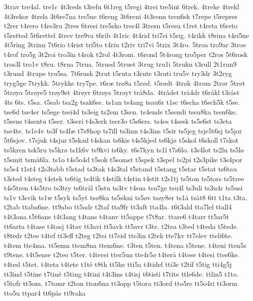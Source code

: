 3trav
tre4al.
tre1c
4t3reds
t3refu
6t1reg
t5regi
4trei
tre5int
6trek.
4treke
4trekl
4t3rekor
4trela
3t6re7na
tre5ne
t6reng
3t6reni
4t3renn
tren6sk
t7repe
t5repres
t2rer
t4rero
t4re3ru
2tres
6tresi
tre5sko
tres4l
3tresn
t5resu
t1ret
t4reta
t6reto
t5retted
5t6rettel
4trev
tre9va
t6rib
4t1ric
4t4rid
tri7ei
t5rig.
t4rikk
t8rina
t4ri5ne
4t5ring
3trinn
7t6rio
t4rist
tri5to
t4riu
t2riv
tri7vi
5trix
3t4ro.
5troa
tro9ar
3troe
t4rof
tro5g
3t2roi
tro3in
t4rok
t2rol
4t3rom.
t6rond
5t4rong
tro5per
t2ros
5t6rosk
tros3l
tro1v
t8ru.
t8rua
7trua.
5trued
5truet
3trug
tru1i
5trukn
t3rull
2t1run9
t3rund
4trupe
tru5sa.
7t6rusk
2trut
t5ruta
t3rute
t3ruti
tru5v
try3dr
3t2ryg
tryg5ge
7trykk.
5trykke
try7pe.
t6r^^e6
tr^^f88a
t5r^^f8d.
t5r^^f8dt
4tr^^f8k
4tr^^f8m
2tr^^f8r
5tr^^f8t
5tr^^f8ya
5tr^^f8ye5
tr^^f8y9et
4tr^^f8yr
6tr^^f8ys
5tr^^f8yt
tr^^e58da.
4tr^^e5det
tr^^e54dr
t6r^^e5kl
t3r^^e5st
4ts
6ts.
t5sa.
t5sab
tsa2g
tsak6se.
ts1an
ts4ang
tsau6r
t1sc
t6scha
t6sch5k
t5se.
tse6d
tse4er
ts5ege
tsei4d
ts3eig
ts2em
t3sen.
ts4ende
t5sendi
tsen8ka
tsen6ke.
t5sens
t4sentu
t5ser.
t3seri
t4s3erk
tser3o
t5s6ers.
ts4es
t4sesk
ts5e6st
ts3eta
tse4te.
ts1e4v
ts3f
ts4f^^e6
t7s8hop
ts7ill
ts3inn
t4s3ins
t5sir
ts5jeg
tsje5t6sj
ts5jor
5t6sjov.
t7sjuk
t4sjur
t5skad
t4skan
ts6kis
t4s5kjed
ts6kj^^f8
t5skol
t6skoll
t7skot
ts5kren
tsk5ru
ts5kr^^f8
ts1k6v
ts9kvi
ts6ky.
t6s7kyn
ts1l
t7s6lo.
t3s4lot
ts2lu
ts5l^^f8
t5smit
tsm^^e56la.
ts1o
t4s5o4d
t5sok
t5somst
t5spek
t3spel
ts2pi
t2s3pike
t3s4por
ts5s4
t1st4
t2s3tabb
t5stad
ts3tak
t4s3tal
t5stand
t5stang
t5star
t5stat
ts6tau
t3sted
t4steg
t4stek
ts6tig
ts4tik
t4stilk
t4stin
t4stit
t2s1tj
ts5ton
ts5tors
ts5tree
t4s5tren
t4s5tro
ts3try
ts6tr^^e5l
t5stu
ts3tv
t4sua
tsu7ge
tsu4l
ts3uli
ts3u4r
ts5usi
ts1v
t3svik
ts1w
t5syk
ts5yt
ts^^f88ka
ts5^^f8kni
ts5^^f8v
ts^^f8y8er
ts1^^e5
ts^^e5t8
6tt
t1ta
t3ta.
t2tab
ttaba6ne.
tt9abo
tt5adr
t2taf
tta9fr
tt3aft
tta4la.
t6t3ald
tta7lel
ttall4
t4t3ana
t5t6ane
t4t3ang
t4tans
t4tanv
tt5appe
t7t8ar.
ttare6
t4tarr
tt5ar5t
tt6arta
t4tase
t4tasj
t4tav
tt3avi
tt5avk
tt5avr
t3te.
t2tea
t3ted
t4teda
t5tede.
t8tedr
t2tee
t4tef
tt3eff
t2teg
t2tei
tt7eid
tte3in
t2tek
tte7kv
tt7elev
tteli6te.
t4tem
tte4ma.
tt5emn
ttem8na
ttem6ne.
t3ten
t5ten.
t4tena
t5tene.
t4teni
tten5s
t9tens.
t4t5ense
t2teo
t5ter.
t4terei
tter5un
tte4r5^^f8
t4ter^^e5
t4tese
t4tesi
ttes6ke.
t4tesl
t5tet.
t4teta
t4tete
t1t^^e9
t8th
tt5he
tti5a
t4tidel
tti3e
t2tif
t5tig
tti4g5j
tt3ind
t5tine
t7tin^^e9
t5ting
t4tini
t4t3ins
t4tisj
t6tisti
t7tite
ttle6de.
ttlin5
t1to.
t5tofr
tt5om.
t7tomr
t2ton
tton6na
tt3opp
t5tora
tt3ord
tto5re
tt5o4ri
tt3orm
tto5u
ttpar4
tt6p^^e5s
tt9raka
